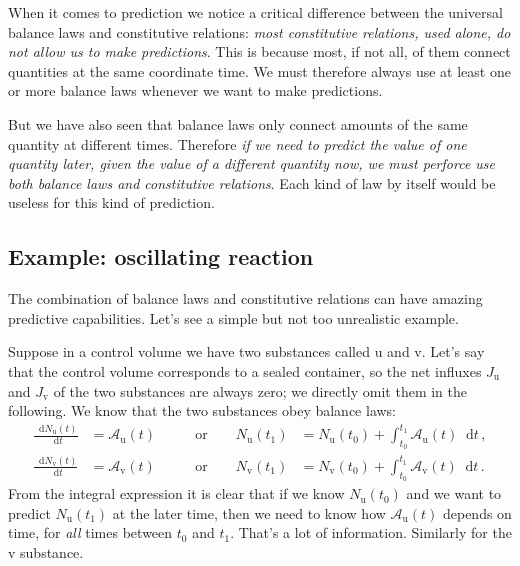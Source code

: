 \documentclass[a4paper,12pt,%
onecolumn,oneside,%
british%
]{memoir}
\newcommand*{\di}{\mathop{}\!\mathrm{d}}%
\renewcommand*{\|}[1][]{\nonscript\:#1\vert\nonscript\:\mathopen{}}
\newcommand*{\yti}{t_{0}}
\newcommand*{\ytf}{t_{1}}
\newcommand*{\dt}{\di t}
\newcommand*{\yN}{N}
\newcommand*{\yJ}{J}
\newcommand*{\ya}{\mathcal{A}}
\newcommand*{\yNu}{\yN_{\text{u}}}
\newcommand*{\yNv}{\yN_{\text{v}}}
\newcommand*{\yJu}{\yJ_{\text{u}}}
\newcommand*{\yJv}{\yJ_{\text{v}}}
\newcommand*{\yau}{\ya_{\text{u}}}
\newcommand*{\yav}{\ya_{\text{v}}}
\begin{document}
When it comes to prediction we notice a critical difference between the universal balance laws and constitutive relations: \emph{most constitutive relations, used alone, do not allow us to make predictions}. This is because most, if not all, of them connect quantities at the same coordinate time. We must therefore always use at least one or more balance laws whenever we want to make predictions.

But we have also seen that balance laws only connect amounts of the same quantity at different times. Therefore \emph{if we need to predict the value of one quantity later, given the value of a different quantity now, we must perforce use both balance laws and constitutive relations}. Each kind of law by itself would be useless for this kind of prediction.

\subsection{Example: oscillating reaction}\label{sec:oscillating_reaction}

The combination of balance laws and constitutive relations can have amazing predictive capabilities. Let's see a simple but not too unrealistic example.

Suppose in a control volume we have two substances called $\mathrm{u}$ and $\mathrm{v}$. Let's say that the control volume corresponds to a sealed container, so the net influxes $\yJu$ and $\yJv$ of the two substances are always zero; we directly omit them in the following. We know that the two substances obey balance laws:
\begin{equation*}
  \begin{aligned}
    \frac{\di\yNu(t)}{\dt} &= \yau(t)
    &\qquad\text{or}\qquad
    \yNu(\ytf) &= \yNu(\yti) +
    \int_{\yti}^{\ytf}\!\!\yau(t)\dt \,,
    \\
    \frac{\di\yNv(t)}{\dt} &= \yav(t)
    &\qquad\text{or}\qquad
    \yNv(\ytf) &= \yNv(\yti) +
    \int_{\yti}^{\ytf}\!\!\yav(t)\dt \,.
  \end{aligned}
\end{equation*}
From the integral expression it is clear that if we know $\yNu(\yti)$ and we want to predict $\yNu(\ytf)$ at the later time, then we need to know how $\yau(t)$ depends on time, for \emph{all} times between $\yti$ and $\ytf$. That's a lot of information. Similarly for the $\mathrm{v}$ substance.
\end{document}
